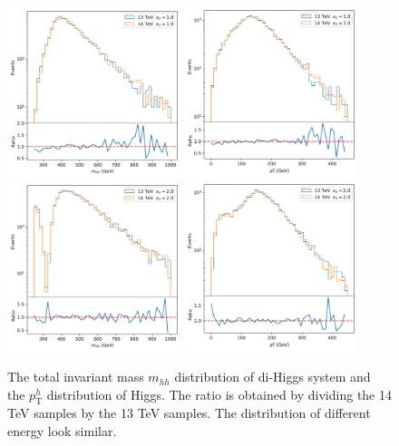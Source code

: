 \documentclass[12pt]{article}
\begin{document}
		\begin{figure}[htpb]
			\centering
			\includegraphics[width=0.45\textwidth]{di-Higgs-SM-kappa1-mhh-13-14TeV.png}
			\includegraphics[width=0.45\textwidth]{di-Higgs-SM-kappa1-pt-13-14TeV.png}
			\includegraphics[width=0.45\textwidth]{di-Higgs-SM-kappa2-mhh-13-14TeV.png}
			\includegraphics[width=0.45\textwidth]{di-Higgs-SM-kappa2-pt-13-14TeV.png}
			\caption{The total invariant mass $m_{hh}$ distribution of di-Higgs system and the $p_{\text{T}}^{h}$ distribution of Higgs. The ratio is obtained by dividing the 14 TeV samples by the 13 TeV samples. The distribution of different energy look similar.}
			\label{fig:di-Higgs-SM-kappa-13-14TeV}
		\end{figure}
\end{document}
